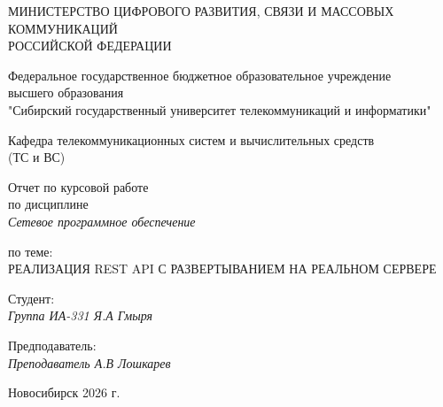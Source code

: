 \thispagestyle{empty}

\begin{center}
    МИНИСТЕРСТВО ЦИФРОВОГО РАЗВИТИЯ, СВЯЗИ И МАССОВЫХ КОММУНИКАЦИЙ \\ РОССИЙСКОЙ ФЕДЕРАЦИИ

    \vspace{20pt}

    Федеральное государственное бюджетное образовательное учреждение  \\  высшего образования \\
    "Сибирский государственный университет телекоммуникаций и информатики" \\

    \vspace{20pt}

    Кафедра телекоммуникационных систем и вычислительных средств \\  (ТС и ВС)
\end{center}

\vfill

\begin{center}
    Отчет по курсовой работе \\  
    по дисциплине \\
    \textit{Сетевое программное обеспечение}

    \vspace{20pt}

    по теме: \\
    \uppercase{Реализация REST API с развертыванием на реальном сервере}
\end{center}

\vfill

    \noindent Студент: \\
    \textit{Группа ИА-331 \hfill Я.А Гмыря}

    \vspace{20pt}

    \noindent Предподаватель: \\
    \textit{Преподаватель \hfill А.В Лошкарев}

\vfill

\begin{center}
    Новосибирск 2026 г.
\end{center}